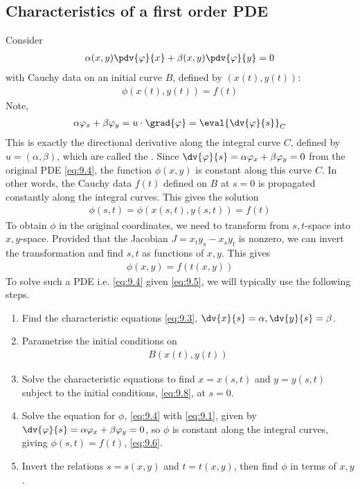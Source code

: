 \subsection{Characteristics of a first order PDE}
Consider
\begin{align} \label{eq:9.4}
	\alpha(x,y) \pdv{\phi}{x} + \beta(x,y) \pdv{\phi}{y} = 0
\end{align}
with Cauchy data on an initial curve $B$, defined by $(x(t), y(t))$:
\begin{align} \label{eq:9.5}
	\phi(x(t), y(t)) = f(t)
\end{align}
Note,
\begin{align*}
	\alpha \phi_x + \beta \phi_y = u \cdot \grad{\phi} = \eval{\dv{\phi}{s}}_C
\end{align*}
This is exactly the directional derivative along the integral curve $C$, defined by $u = (\alpha, \beta)$, which are called the .
Since $\dv{\phi}{s} = \alpha \phi_x + \beta \phi_y = 0$ from the original PDE \cref{eq:9.4}, the function $\phi(x,y)$ is constant along this curve $C$.
In other words, the Cauchy data $f(t)$ defined on $B$ at $s = 0$ is propagated constantly along the integral curves.
This gives the solution
\begin{align} \label{eq:9.6}
	\phi(s,t) = \phi(x(s,t), y(s,t)) = f(t)
\end{align}
To obtain $\phi$ in the original coordinates, we need to transform from $s,t$-space into $x,y$-space.
Provided that the Jacobian $J = x_t y_s - x_s y_t$ is nonzero, we can invert the transformation and find $s,t$ as functions of $x,y$.
This gives
\begin{align} \label{eq:9.7}
	\phi(x,y) = f(t(x,y))
\end{align}
To solve such a PDE i.e. \cref{eq:9.4} given \cref{eq:9.5}, we will typically use the following steps.
\begin{enumerate}
	\item Find the characteristic equations \cref{eq:9.3}, $\dv{x}{s} = \alpha, \dv{y}{s} = \beta$.
	\item Parametrise the initial conditions on 
    \begin{align} \label{eq:9.8}
        B(x(t), y(t))
    \end{align}
	\item Solve the characteristic equations to find $x = x(s,t)$ and $y = y(s,t)$ subject to the initial conditions, \cref{eq:9.8}, at $s = 0$.
	\item Solve the equation for $\phi$, \cref{eq:9.4} with \cref{eq:9.1}, given by $\dv{\phi}{s} = \alpha \phi_x + \beta \phi_y = 0$, so $\phi$ is constant along the integral curves, giving $\phi(s,t) = f(t)$, \cref{eq:9.6}.
	\item Invert the relations $s = s(x,y)$ and $t = t(x,y)$, then find $\phi$ in terms of $x,y$.
\end{enumerate}

